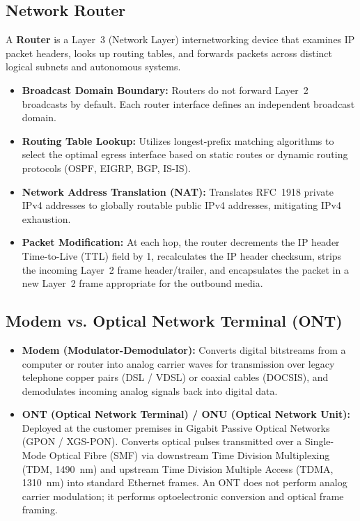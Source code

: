 \subsection{Network Router}
A \textbf{Router} is a Layer~3 (Network Layer) internetworking device that examines IP packet headers, looks up routing tables, and forwards packets across distinct logical subnets and autonomous systems.
\begin{itemize}[leftmargin=*]
    \item \textbf{Broadcast Domain Boundary:} Routers do not forward Layer~2 broadcasts by default. Each router interface defines an independent broadcast domain.
    \item \textbf{Routing Table Lookup:} Utilizes longest-prefix matching algorithms to select the optimal egress interface based on static routes or dynamic routing protocols (OSPF, EIGRP, BGP, IS-IS).
    \item \textbf{Network Address Translation (NAT):} Translates RFC~1918 private IPv4 addresses to globally routable public IPv4 addresses, mitigating IPv4 exhaustion.
    \item \textbf{Packet Modification:} At each hop, the router decrements the IP header Time-to-Live (TTL) field by 1, recalculates the IP header checksum, strips the incoming Layer~2 frame header/trailer, and encapsulates the packet in a new Layer~2 frame appropriate for the outbound media.
\end{itemize}

\subsection{Modem vs. Optical Network Terminal (ONT)}
\begin{itemize}[leftmargin=*]
    \item \textbf{Modem (Modulator-Demodulator):} Converts digital bitstreams from a computer or router into analog carrier waves for transmission over legacy telephone copper pairs (DSL / VDSL) or coaxial cables (DOCSIS), and demodulates incoming analog signals back into digital data.
    \item \textbf{ONT (Optical Network Terminal) / ONU (Optical Network Unit):} Deployed at the customer premises in Gigabit Passive Optical Networks (GPON / XGS-PON). Converts optical pulses transmitted over a Single-Mode Optical Fibre (SMF) via downstream Time Division Multiplexing (TDM, 1490~nm) and upstream Time Division Multiple Access (TDMA, 1310~nm) into standard Ethernet frames. An ONT does not perform analog carrier modulation; it performs optoelectronic conversion and optical frame framing.
\end{itemize}

